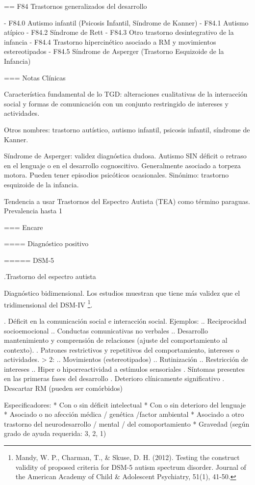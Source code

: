 \documentclass[encares.tex]{subfiles}
\begin{document}
== F84 Trastornos generalizados del desarrollo

- F84.0 Autismo infantil (Psicosis Infantil, Síndrome de Kanner)
- F84.1 Autismo atípico
- F84.2 Síndrome de Rett
- F84.3 Otro trastorno desintegrativo de la infancia
- F84.4 Trastorno hipercinético asociado a RM y movimientos estereotipados
- F84.5 Síndrome de Asperger (Trastorno Esquizoide de la Infancia)

=== Notas Clínicas

Característica fundamental de lo TGD: alteraciones cualitativas de la interacción social y formas de comunicación con un conjunto restringido de intereses y actividades.

Otros nombres: trastorno autístico, autismo infantil, psicosis infantil, síndrome de Kanner.

Síndrome de Asperger: validez diagnóstica dudosa. Autismo SIN déficit o retraso en el lenguaje o en el desarrollo cognoscitivo. Generalmente asociado a torpeza motora. Pueden tener episodios psicóticos ocasionales. Sinónimo: trastorno esquizoide de la infancia.

Tendencia a usar Trastornos del Espectro Autista (TEA) como término paraguas. Prevalencia hasta 1%

=== Encare

==== Diagnóstico positivo

===== DSM-5

.Trastorno del espectro autista

Diagnóstico bidimensional. Los estudios muestran que tiene más validez que el tridimensional del DSM-IV \footnote{Mandy, W. P., Charman, T., \& Skuse, D. H. (2012). Testing the construct validity of proposed criteria for DSM-5 autism spectrum disorder. Journal of the American Academy of Child \& Adolescent Psychiatry, 51(1), 41-50.}.

. Déficit en la comunicación social e interacción social. Ejemplos:
.. Reciprocidad socioemocional
.. Conductas comunicativas no verbales
.. Desarrollo mantenimiento y comprensión de relaciones (ajuste del comportamiento al contexto).
. Patrones restrictivos y repetitivos del comportamiento, intereses o actividades. > 2:
.. Movimientos (estereotipados)
.. Rutinización
.. Restricción de intereses
.. Hiper o hiporreactividad a estímulos sensoriales
. Síntomas presentes en las primeras fases del desarrollo
. Deterioro clínicamente significativo
. Descartar RM (pueden ser comórbidos)

Especificadores:
* Con o sin déficit intelectual
* Con o sin deterioro del lenguaje
* Asociado o no afección médica / genética /factor ambiental
* Asociado a otro trastorno del neurodesarrollo / mental / del comoportamiento
* Gravedad (según grado de ayuda requerida: 3, 2, 1)
\end{document}
